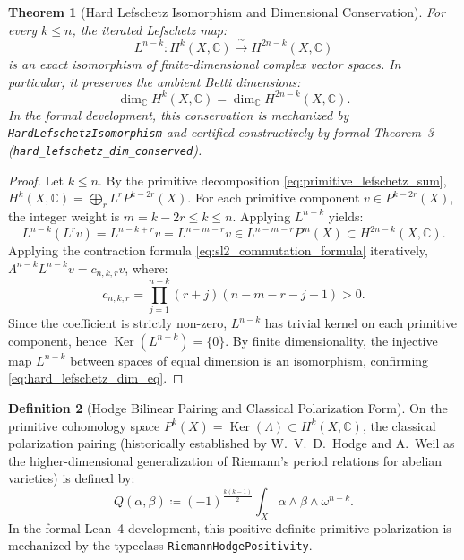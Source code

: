 \documentclass[11pt,a4paper]{article}
\theoremstyle{definition}
\newtheorem{definition}{Definition}[section]
\theoremstyle{plain}
\newtheorem{theorem}[definition]{Theorem}
\DeclareMathOperator{\Ker}{Ker}
\begin{document}
\begin{theorem}[Hard Lefschetz Isomorphism and Dimensional Conservation]
\label{thm:hard_lefschetz}
For every $k \le n$, the iterated Lefschetz map:
\begin{equation}
    \label{eq:hard_lefschetz_iso}
    L^{n-k}: H^k(X, \mathbb{C}) \xrightarrow{\;\sim\;} H^{2n-k}(X, \mathbb{C})
\end{equation}
is an exact isomorphism of finite-dimensional complex vector spaces. In particular, it preserves the ambient Betti dimensions:
\begin{equation}
    \label{eq:hard_lefschetz_dim_eq}
    \dim_{\mathbb{C}} H^k(X, \mathbb{C}) = \dim_{\mathbb{C}} H^{2n-k}(X, \mathbb{C}).
\end{equation}
In the formal development, this conservation is mechanized by \texttt{HardLefschetzIsomorphism} and certified constructively by formal Theorem~3 (\texttt{hard\_lefschetz\_dim\_conserved}).
\end{theorem}

\begin{proof}
Let $k \le n$. By the primitive decomposition \eqref{eq:primitive_lefschetz_sum}, $H^k(X, \mathbb{C}) = \bigoplus_r L^r P^{k-2r}(X)$. For each primitive component $v \in P^{k-2r}(X)$, the integer weight is $m = k - 2r \le k \le n$. Applying $L^{n-k}$ yields:
\begin{equation}
    L^{n-k}(L^r v) = L^{n-k+r} v = L^{n-m-r} v \in L^{n-m-r} P^m(X) \subset H^{2n-k}(X, \mathbb{C}).
\end{equation}
Applying the contraction formula \eqref{eq:sl2_commutation_formula} iteratively, $\Lambda^{n-k} L^{n-k} v = c_{n,k,r} v$, where:
\begin{equation}
    c_{n,k,r} = \prod_{j=1}^{n-k} (r + j)(n - m - r - j + 1) > 0.
\end{equation}
Since the coefficient is strictly non-zero, $L^{n-k}$ has trivial kernel on each primitive component, hence $\Ker(L^{n-k}) = \{0\}$. By finite dimensionality, the injective map $L^{n-k}$ between spaces of equal dimension is an isomorphism, confirming \eqref{eq:hard_lefschetz_dim_eq}.
\end{proof}

\begin{definition}[Hodge Bilinear Pairing and Classical Polarization Form]
\label{def:riemann_hodge_pairing}
On the primitive cohomology space $P^k(X) = \Ker(\Lambda) \subset H^k(X, \mathbb{C})$, the classical polarization pairing (historically established by W.~V.~D.~Hodge\cite{hodge_1950} and A.~Weil\cite{weil_1958} as the higher-dimensional generalization of Riemann's period relations for abelian varieties) is defined by:
\begin{equation}
    \label{eq:riemann_form}
    Q(\alpha, \beta) \coloneqq (-1)^{\frac{k(k-1)}{2}} \int_X \alpha \wedge \beta \wedge \omega^{n-k}.
\end{equation}
In the formal Lean~4 development, this positive-definite primitive polarization is mechanized by the typeclass \texttt{RiemannHodgePositivity}.
\end{definition}
\end{document}
